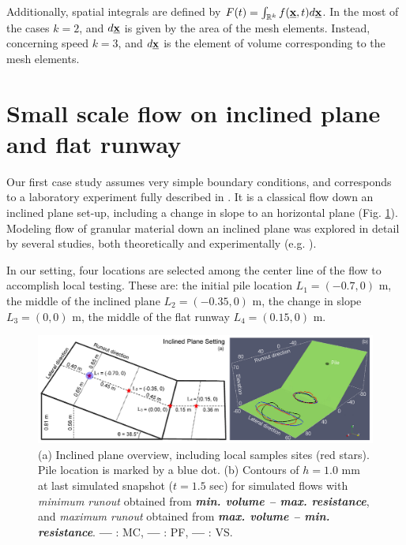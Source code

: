 \documentclass{article}
\begin{document}
Additionally, spatial integrals are defined by $F(t)=\int_{\mathbb R^k}f(\underline{\textbf x},t) d\underline{\textbf x}$. In the most of the cases $k=2$, and $d\underline{\textbf x}$ is given by the area of the mesh elements. Instead, concerning speed $k=3$, and $d\underline{\textbf x}$ is the element of volume corresponding to the mesh elements.

\section{Small scale flow on inclined plane and flat runway}\label{sec:QoIs}
Our first case study assumes very simple boundary conditions, and corresponds to a laboratory experiment fully described in \cite{Webb2004, Bursik2005, WebbBursik2016}. It is a classical flow down an inclined plane set-up, including a change in slope to an horizontal plane (Fig. \ref{fig:Ramp-first}). Modeling flow of granular material down an inclined plane was explored in detail by several studies, both theoretically and experimentally (e.g. \cite{RuyerQuil2000, Silbert2001, Pitman2003b}).

In our setting, four locations are selected among the center line of the flow to accomplish local testing. These are: the initial pile location $L_1=(-0.7,0)$ m, the middle of the inclined plane $L_2=(-0.35,0)$ m, the change in slope $L_3=(0,0)$ m, the middle of the flat runway $L_4=(0.15,0)$ m.
\begin{figure}[H]
    \includegraphics[width=1\textwidth]{InclinedPlane/InclPlane_new.jpg}
    \centering
    \caption{(a) Inclined plane overview, including local samples sites (red stars). Pile location is marked by a blue dot. (b) Contours of $h = 1.0$ mm at last simulated snapshot ($t = 1.5$ sec) for simulated flows with \emph{minimum runout} obtained from \emph{\textbf{min. volume -- max. resistance}}, and \emph{maximum runout} obtained from \emph{\textbf{max. volume -- min. resistance}}. {\color{red} \textbf{---}} : MC, {\color{blue} \textbf{---}} : PF, \textbf{---} : VS.} \label{fig:Ramp-first}
\end{figure}
\end{document}
